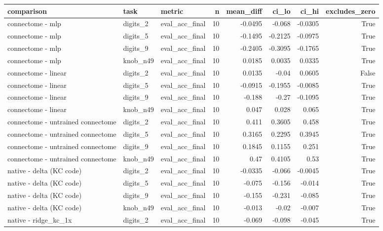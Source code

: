 \begin{table}[t]
\centering
\small
\begin{tabular}{lllrrrrr}
\toprule
comparison & task & metric & n & mean\_diff & ci\_lo & ci\_hi & excludes\_zero \\
\midrule
connectome - mlp & digits\_2 & eval\_acc\_final & 10 & -0.0495 & -0.068 & -0.0305 & True \\
connectome - mlp & digits\_5 & eval\_acc\_final & 10 & -0.1495 & -0.2125 & -0.0975 & True \\
connectome - mlp & digits\_9 & eval\_acc\_final & 10 & -0.2405 & -0.3095 & -0.1765 & True \\
connectome - mlp & knob\_n49 & eval\_acc\_final & 10 & 0.0185 & 0.0035 & 0.0335 & True \\
connectome - linear & digits\_2 & eval\_acc\_final & 10 & 0.0135 & -0.04 & 0.0605 & False \\
connectome - linear & digits\_5 & eval\_acc\_final & 10 & -0.0915 & -0.1955 & -0.0085 & True \\
connectome - linear & digits\_9 & eval\_acc\_final & 10 & -0.188 & -0.27 & -0.1095 & True \\
connectome - linear & knob\_n49 & eval\_acc\_final & 10 & 0.047 & 0.028 & 0.065 & True \\
connectome - untrained connectome & digits\_2 & eval\_acc\_final & 10 & 0.411 & 0.3605 & 0.458 & True \\
connectome - untrained connectome & digits\_5 & eval\_acc\_final & 10 & 0.3165 & 0.2295 & 0.3945 & True \\
connectome - untrained connectome & digits\_9 & eval\_acc\_final & 10 & 0.1845 & 0.1155 & 0.251 & True \\
connectome - untrained connectome & knob\_n49 & eval\_acc\_final & 10 & 0.47 & 0.4105 & 0.53 & True \\
native - delta (KC code) & digits\_2 & eval\_acc\_final & 10 & -0.0335 & -0.066 & -0.0045 & True \\
native - delta (KC code) & digits\_5 & eval\_acc\_final & 10 & -0.075 & -0.156 & -0.014 & True \\
native - delta (KC code) & digits\_9 & eval\_acc\_final & 10 & -0.155 & -0.231 & -0.085 & True \\
native - delta (KC code) & knob\_n49 & eval\_acc\_final & 10 & -0.013 & -0.02 & -0.007 & True \\
native - ridge\_kc\_1x & digits\_2 & eval\_acc\_final & 10 & -0.069 & -0.098 & -0.045 & True \\

\end{tabular}
\end{table}

